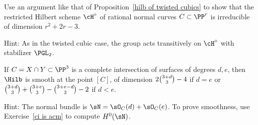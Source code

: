 \begin{exercise}
\label{rational normal hilbert}
Use an  argument like that of Proposition~\ref{hilb of twisted cubics}
to show that the restricted Hilbert scheme $\cH^\circ$ of rational normal
%
curves $C \subset \PP^r$ is irreducible of dimension $r^2+2r-3$.

Hint: As in the twisted cubic case, the group
%
acts
transitively on $\cH^\circ$ with stabilizer $\PGL_2$.
\end{exercise}

\begin{exercise}
\label{hilb at a ci}
If $C = X\cap Y\subset \PP^3$ is a
%
complete intersection
 of surfaces of
degrees $d,e$, then
$\Hilb$ is smooth at the point $[C]$, of dimension $2\tbinom{3+d}{3}-4$
if $d=e$
or $\tbinom{3+d}{3} +\tbinom{3+e}{3} -\tbinom{3+e-d}{3} -2$ if $d<e$.

Hint: The normal bundle is $\sN = \sO_C(d)+\sO_C(e)$. To prove smoothness,
use
Exercise~\ref{ci is acm} to compute $H^0(\sN)$.
\end{exercise}



